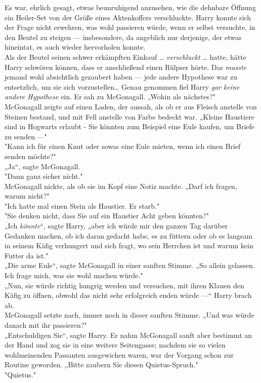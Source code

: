 {Es war, ehrlich gesagt, etwas beunruhigend anzusehen, wie die dehnbare Öffnung ein Heiler-Set von der Größe eines Aktenkoffers verschluckte. Harry konnte sich der Frage nicht erwehren, was wohl passieren würde, wenn er selbst versuchte, in den Beutel zu steigen --- insbesondere, da angeblich nur derjenige, der etwas hineintat, es auch wieder hervorholen konnte.\\ Als der Beutel seinen schwer erkämpften Einkauf … \emph{verschluckt} … hatte, hätte Harry schwören können, dass er anschließend einen Rülpser hörte. Das \emph{musste} jemand wohl absichtlich gezaubert haben --- jede andere Hypothese war zu entsetzlich, um sie sich vorzustellen… Genau genommen fiel Harry \emph{gar keine andere Hypothese} ein. Er sah zu McGonagall. „Wohin als nächstes?"\\ McGonagall zeigte auf einen Laden, der aussah, als ob er aus Fleisch anstelle von Steinen bestand, und mit Fell anstelle von Farbe bedeckt war. „Kleine Haustiere sind in Hogwarts erlaubt - Sie könnten zum Beispiel eine Eule kaufen, um Briefe zu senden ---"\\ "Kann ich für einen Knut oder sowas eine Eule mieten, wenn ich einen Brief senden möchte?"\\ „Ja“, sagte McGonagall.\\ "Dann ganz sicher nicht."\\ McGonagall nickte, als ob sie im Kopf eine Notiz machte. „Darf ich fragen, warum nicht?"\\ "Ich hatte mal einen Stein als Haustier. Er starb."\\ "Sie denken nicht, dass Sie auf ein Haustier Acht geben könnten?"\\ „Ich \emph{könnte}“, sagte Harry, „aber ich würde mir den ganzen Tag darüber Gedanken machen, ob ich daran gedacht habe, es zu füttern oder ob es langsam in seinem Käfig verhungert und sich fragt, wo sein Herrchen ist und warum kein Futter da ist."\\ „Die arme Eule“, sagte McGonagall in einer sanften Stimme. „So allein gelassen. Ich frage mich, was sie wohl machen würde."\\ „Nun, sie würde richtig hungrig werden und versuchen, mit ihren Klauen den Käfig zu öffnen, obwohl das nicht sehr erfolgreich enden würde ---“ Harry brach ab.\\ McGonagall setzte nach, immer noch in dieser sanften Stimme. „Und was würde danach mit ihr passieren?"\\ „Entschuldigen Sie“, sagte Harry. Er nahm McGonagall sanft aber bestimmt an der Hand und zog sie in eine weitere Seitengasse; nachdem sie so vielen wohlmeinenden Passanten ausgewichen waren, war der Vorgang schon zur Routine geworden. „Bitte zaubern Sie diesen Quietus-Spruch."\\ "Quietus."

}
